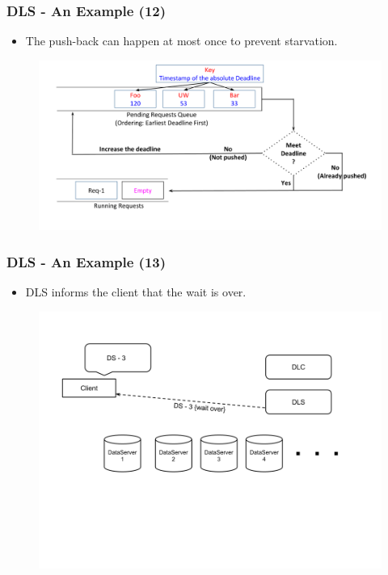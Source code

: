 \documentclass{beamer}
\begin{document}
\begin{frame}
  \frametitle{DLS - An Example (12)}
  \begin{itemize}
  \item The push-back can happen at most once to prevent starvation.
    \newline
    \newline
  \end{itemize}
  \begin{figure}
    \begin{center}
      \centerline{\includegraphics[scale=0.33]{img/DLS_Example8_6.png}}
    \end{center}
  \end{figure}
\end{frame}

\begin{frame}
  \frametitle{DLS - An Example (13)}
  \begin{itemize}
  \item DLS informs the client that the wait is over.
\newline
  \end{itemize}
  \begin{figure}
    \begin{center}
      \centerline{\includegraphics[scale=0.35]{img/DLS_Example10.png}}
    \end{center}
  \end{figure}
\end{frame}
\end{document}
